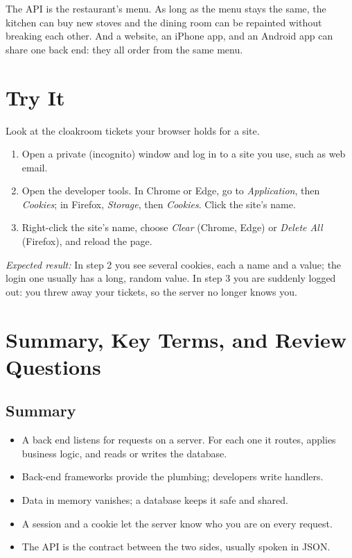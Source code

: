 The API is the restaurant's menu. As long as the menu stays the same, the kitchen can buy new stoves and the dining room can be repainted without breaking each other. And a website, an iPhone app, and an Android app can share one back end: they all order from the same menu.

\section{Try It}\label{03-the-back-end:try-it}

Look at the cloakroom tickets your browser holds for a site.

\begin{enumerate}
\def\labelenumi{\arabic{enumi}.}
\tightlist
\item
  Open a private (incognito) window and log in to a site you use, such as web email.
\item
  Open the developer tools. In Chrome or Edge, go to \emph{Application}, then \emph{Cookies}; in Firefox, \emph{Storage}, then \emph{Cookies}. Click the site's name.
\item
  Right-click the site's name, choose \emph{Clear} (Chrome, Edge) or \emph{Delete All} (Firefox), and reload the page.
\end{enumerate}

\emph{Expected result:} In step 2 you see several cookies, each a name and a value; the login one usually has a long, random value. In step 3 you are suddenly logged out: you threw away your tickets, so the server no longer knows you.

\section{Summary, Key Terms, and Review Questions}\label{03-the-back-end:summary-key-terms-and-review-questions}

\subsection*{Summary}\label{03-the-back-end:summary}

\begin{itemize}
\tightlist
\item
  A back end listens for requests on a server. For each one it routes, applies business logic, and reads or writes the database.
\item
  Back-end frameworks provide the plumbing; developers write handlers.
\item
  Data in memory vanishes; a database keeps it safe and shared.
\item
  A session and a cookie let the server know who you are on every request.
\item
  The API is the contract between the two sides, usually spoken in JSON.
\end{itemize}

